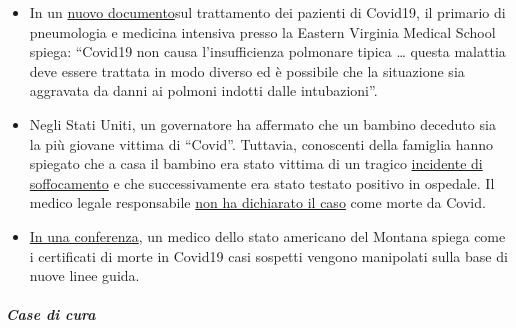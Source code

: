 \begin{itemize}
{  breve} del solito.
\item
  In un
  \href{https://www.evms.edu/media/evms_public/departments/internal_medicine/EVMS_Critical_Care_COVID-19_Protocol.pdf}{nuovo
  documento}sul trattamento dei pazienti di Covid19, il primario di
  pneumologia e medicina intensiva presso la Eastern Virginia Medical
  School spiega: ``Covid19 non causa l'insufficienza polmonare tipica
  \ldots{} questa malattia deve essere trattata in modo diverso ed è
  possibile che la situazione sia aggravata da danni ai polmoni indotti
  dalle intubazioni''.
\item
  Negli Stati Uniti, un governatore ha affermato che un bambino deceduto
  sia la più giovane vittima di ``Covid''. Tuttavia, conoscenti della
  famiglia hanno spiegato che a casa il bambino era stato vittima di un
  tragico
  \href{https://www.washingtonexaminer.com/news/candace-owens-accuses-connecticut-governor-of-lying-about-coronavirus-death-calls-for-resignation}{incidente
  di soffocamento} e che successivamente era stato testato positivo in
  ospedale. Il medico legale responsabile
  \href{https://www.dailymail.co.uk/news/article-8193487/Coroner-refuses-rule-COVID-19-cause-death-six-week-old-Connecticut-baby.html}{non
  ha dichiarato il caso} come morte da Covid.
\item
  \href{https://www.youtube.com/watch?v=V0lIWZpiRU0}{In una conferenza},
  un medico dello stato americano del Montana spiega come i certificati
  di morte in Covid19 casi sospetti vengono manipolati sulla base di
  nuove linee guida.
\end{itemize}

\hypertarget{case-di-cura}{%
\subparagraph{\texorpdfstring{\textbf{Case di
cura}}{Case di cura}}\label{case-di-cura}}


